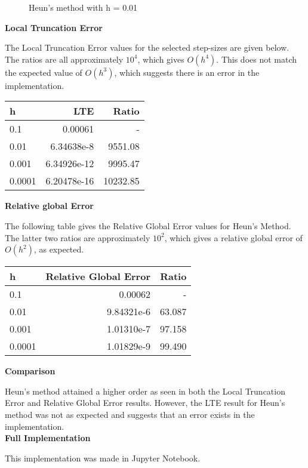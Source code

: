 \documentclass[a4paper,11pt]{article}
\begin{document}
\begin{figure}[H]
\caption{Heun's method  with h = 0.01}\label{figH0.01}
\end{figure}

\textbf{Local Truncation Error}

The Local Truncation Error values for the selected step-sizes are given below. The ratios are all approximately $10^4$, which gives $O(h^4)$. This does not match the expected value of $O(h^3)$, which suggests there is an error in the implementation.
\begin{center}
\begin{tabular}{|l|r|r|}
\hline
h & LTE & Ratio\\
\hline
0.1    & 0.00061 &  - \\
0.01   & 6.34638e-8 & 9551.08\\
0.001  & 6.34926e-12 & 9995.47\\
0.0001 & 6.20478e-16 & 10232.85\\
\hline 
\end{tabular}
\end{center}

\textbf{Relative global Error}

The following table gives the Relative Global Error values for Heun's Method. The latter two ratios are approximately $10^2$, which gives a relative global error of $O(h^2)$, as expected.
\begin{center}
\begin{tabular}{|l|r|r|}
\hline
h & Relative Global Error & Ratio\\
\hline
0.1    & 0.00062 &  - \\
0.01   & 9.84321e-6 & 63.087\\
0.001  & 1.01310e-7 & 97.158\\
0.0001 & 1.01829e-9 & 99.490\\
\hline 
\end{tabular}
\end{center}

\textbf{Comparison}

Heun's method attained a higher order as seen in both the Local Truncation Error and Relative Global Error results. However, the LTE result for Heun's method was not as expected and suggests that an error exists in the implementation.\\

\textbf{Full Implementation}

This implementation was made in Jupyter Notebook.
\end{document}
